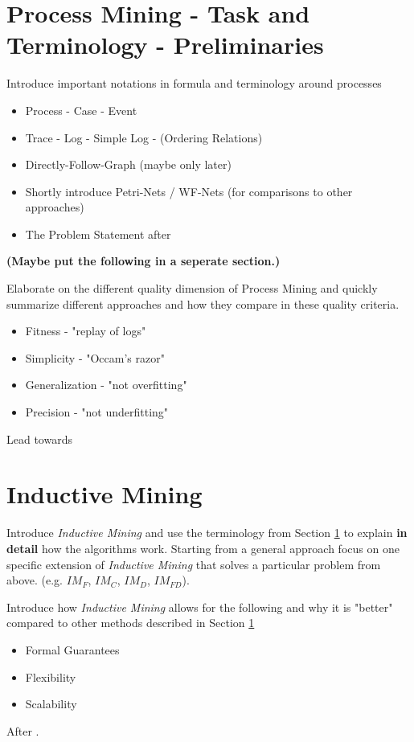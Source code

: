 \documentclass[a4paper]{IEEEtran}
\begin{document}
\section{Process Mining - Task and Terminology - Preliminaries}
\label{sec:terminology}
Introduce important notations in formula and terminology around processes
\begin{itemize}
    \item Process - Case - Event 
    \item Trace - Log - Simple Log - (Ordering Relations) 
    \item Directly-Follow-Graph (maybe only later)
    \item Shortly introduce Petri-Nets / WF-Nets (for comparisons to other approaches)
    \item The Problem Statement after \cite{process_mining}
\end{itemize}
\textbf{(Maybe put the following in a seperate section.)}


Elaborate on the different quality dimension of Process Mining and quickly summarize different approaches and how they compare in these quality criteria.
\begin{itemize}
    \item Fitness - "replay of logs"
    \item Simplicity - "Occam's razor" 
    \item Generalization - "not overfitting" 
    \item Precision - "not underfitting" 
\end{itemize}
Lead towards 

\section{Inductive Mining}
\label{sec:inductivemining}
Introduce \textit{Inductive Mining} and use the terminology from Section \ref{sec:terminology} to explain \textbf{in detail} how the algorithms work. Starting from a general approach focus on one specific extension of \textit{Inductive Mining} that solves a particular problem from above. (e.g. $IM_F$, $IM_C$, $IM_D$, $IM_{FD}$).

Introduce how \textit{Inductive Mining} allows for the following and why it is "better" compared to other methods described in Section \ref{sec:terminology}
\begin{itemize}
    \item Formal Guarantees
    \item Flexibility 
    \item Scalability
\end{itemize} 
After \cite{process_mining}.
\end{document}
